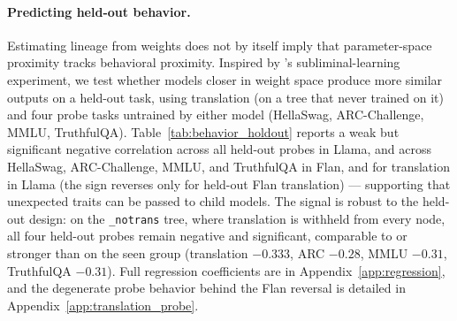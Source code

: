\documentclass{article}
\theoremstyle{definition}
\theoremstyle{plain}
\begin{document}
\paragraph{Predicting held-out behavior.}
\label{sec:results:behavioral}

Estimating lineage from weights does not by itself imply that parameter-space proximity tracks
behavioral proximity. Inspired by \citet{cloud2025subliminal}'s subliminal-learning experiment, we test
whether models closer in weight space produce more similar outputs on a held-out task, using translation
(on a tree that never trained on it) and four probe tasks untrained by either model (HellaSwag,
ARC-Challenge, MMLU, TruthfulQA).
Table~\ref{tab:behavior_holdout} reports a weak but significant negative correlation across all held-out
probes in Llama, and across HellaSwag, ARC-Challenge, MMLU, and TruthfulQA in Flan, and for translation
in Llama (the sign reverses only for held-out Flan translation) --- supporting \citet{cloud2025subliminal}
that unexpected traits can be passed to child models. The signal is robust to the held-out design: on the \texttt{\_notrans} tree, where translation
is withheld from every node, all four held-out probes remain negative and significant, comparable to or
stronger than on the seen group (translation $-0.333$, ARC $-0.28$, MMLU $-0.31$, TruthfulQA $-0.31$).
Full regression coefficients are in Appendix~\ref{app:regression}, and the degenerate probe behavior
behind the Flan reversal is detailed in Appendix~\ref{app:translation_probe}.
\end{document}
